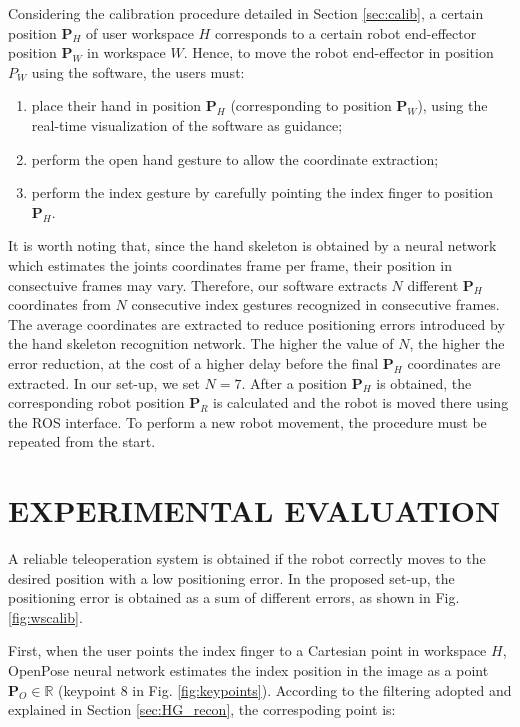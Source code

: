 \documentclass[a4paper, 10 pt, conference]{ieeeconf}      %
\begin{document}
Considering the calibration procedure detailed in Section \ref{sec:calib}, a certain position $\mathbf{P}_{H}$ of user workspace $H$ corresponds to a certain robot end-effector position $\mathbf{P}_{W}$ in workspace $W$. Hence, to move the robot end-effector in position $P_W$  using the software, the users must:
\begin{enumerate}
\item place their hand in position $\mathbf{P}_H$ (corresponding to position $\mathbf{P}_W$), using the real-time visualization of the software as guidance;
\item perform the open hand gesture to allow the coordinate extraction;
\item perform the index gesture by carefully pointing the index finger to position $\mathbf{P}_H$.
\end{enumerate}

It is worth noting that, since the hand skeleton is obtained by a neural network which estimates the joints coordinates frame per frame, their position in consectuive frames may vary. Therefore, our software extracts $N$ different $\mathbf{P}_H$ coordinates from $N$ consecutive index gestures recognized in consecutive frames. The average coordinates are extracted to reduce positioning errors introduced by the hand skeleton recognition network. The higher the value of $N$, the higher the error reduction, at the cost of a higher delay before the final $\mathbf{P}_H$ coordinates are extracted. In our set-up, we set $N = 7$.
After a position $\mathbf{P}_H$ is obtained, the corresponding robot position $\mathbf{P}_R$ is calculated and the robot is moved there using the ROS interface.
To perform a new robot movement, the procedure must be repeated from the start.

\section{EXPERIMENTAL EVALUATION}\label{sec:experiments}

A reliable teleoperation system is obtained if the robot correctly moves to the desired position with a low positioning error. In the proposed set-up, the positioning error is obtained as a sum of different errors, as shown in Fig. \ref{fig:wscalib}.

First, when the user points the index finger to a Cartesian point in workspace $H$, OpenPose neural network estimates the index position in the image as a point $\mathbf{P}_O \in \mathbb{R}$ (keypoint $8$ in Fig. \ref{fig:keypoints}). According to the filtering adopted and explained in Section \ref{sec:HG_recon}, the correspoding point is:
\end{document}
